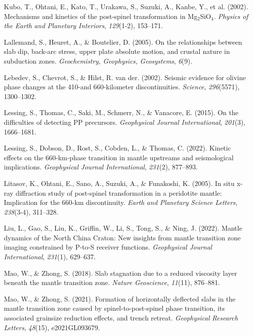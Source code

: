 \documentclass[draft,linenumbers]{agujournal2019}
\newlength{\cslhangindent}
\newenvironment{CSLReferences}[2]
 {\begin{list}{}{
  \setlength{\itemindent}{0pt}
  \setlength{\leftmargin}{0pt}
  \setlength{\parsep}{0pt}
  \ifodd #1
   \setlength{\leftmargin}{\cslhangindent}
   \setlength{\itemindent}{-\cslhangindent}
  \fi
  \setlength{\itemsep}{#2\baselineskip}
  }
  \item\relax}
 {\end{list}}
\begin{document}
\begin{CSLReferences}{1}{0}
Kubo, T., Ohtani, E., Kato, T., Urakawa, S., Suzuki, A., Kanbe, Y., et
al. (2002). Mechanisms and kinetics of the post-spinel transformation in
{Mg\(_2\)SiO\(_4\)}. \emph{Physics of the Earth and Planetary
Interiors}, \emph{129}(1-2), 153--171.

Lallemand, S., Heuret, A., \& Boutelier, D. (2005). On the relationships
between slab dip, back-arc stress, upper plate absolute motion, and
crustal nature in subduction zones. \emph{Geochemistry, Geophysics,
Geosystems}, \emph{6}(9).

Lebedev, S., Chevrot, S., \& Hilst, R. van der. (2002). Seismic evidence
for olivine phase changes at the 410-and 660-kilometer discontinuities.
\emph{Science}, \emph{296}(5571), 1300--1302.

Lessing, S., Thomas, C., Saki, M., Schmerr, N., \& Vanacore, E. (2015).
On the difficulties of detecting {PP} precursors. \emph{Geophysical
Journal International}, \emph{201}(3), 1666--1681.

Lessing, S., Dobson, D., Rost, S., Cobden, L., \& Thomas, C. (2022).
Kinetic effects on the 660-km-phase transition in mantle upstreams and
seismological implications. \emph{Geophysical Journal International},
\emph{231}(2), 877--893.

Litasov, K., Ohtani, E., Sano, A., Suzuki, A., \& Funakoshi, K. (2005).
In situ x-ray diffraction study of post-spinel transformation in a
peridotite mantle: Implication for the 660-km discontinuity. \emph{Earth
and Planetary Science Letters}, \emph{238}(3-4), 311--328.

Liu, L., Gao, S., Liu, K., Griffin, W., Li, S., Tong, S., \& Ning, J.
(2022). Mantle dynamics of the {North China Craton}: New insights from
mantle transition zone imaging constrained by {P-to-S} receiver
functions. \emph{Geophysical Journal International}, \emph{231}(1),
629--637.

Mao, W., \& Zhong, S. (2018). Slab stagnation due to a reduced viscosity
layer beneath the mantle transition zone. \emph{Nature Geoscience},
\emph{11}(11), 876--881.

Mao, W., \& Zhong, S. (2021). Formation of horizontally deflected slabs
in the mantle transition zone caused by spinel-to-post-spinel phase
transition, its associated grainsize reduction effects, and trench
retreat. \emph{Geophysical Research Letters}, \emph{48}(15),
e2021GL093679.


\end{CSLReferences}
\end{document}
